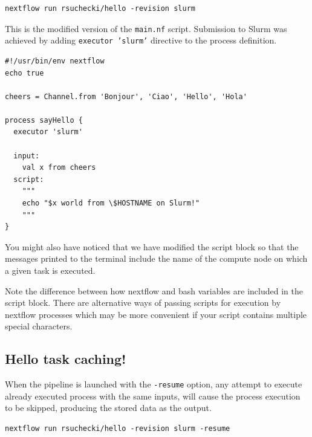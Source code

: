 \begin{steps}
\begin{lstlisting}
nextflow run rsuchecki/hello -revision slurm
\end{lstlisting}
\end{steps}

This is the modified version of the \texttt{main.nf} script. 
Submission to Slurm was achieved by adding \texttt{executor 'slurm'} directive to the process definition.

\begin{lstlisting}
#!/usr/bin/env nextflow
echo true

cheers = Channel.from 'Bonjour', 'Ciao', 'Hello', 'Hola'

process sayHello {
  executor 'slurm'

  input:
    val x from cheers
  script:
    """
    echo "$x world from \$HOSTNAME on Slurm!"
    """
}
\end{lstlisting}

You might also have noticed that we have modified the script block so that the messages printed to the terminal include the name of the compute node on which a given task is executed. 

\begin{warning}
Note the difference between how nextflow and bash variables are included in the script block.
There are alternative ways of passing scripts for execution by nextflow processes which may be more convenient if your script contains multiple special characters.
\end{warning}


\subsection{Hello task caching!}

When the pipeline is launched with the \texttt{-resume} option, 
any attempt to execute already executed process with the same inputs,
will cause the process execution to be skipped, 
producing the stored data as the output.


\begin{steps}
\begin{lstlisting}
nextflow run rsuchecki/hello -revision slurm -resume
\end{lstlisting}
\end{steps}

